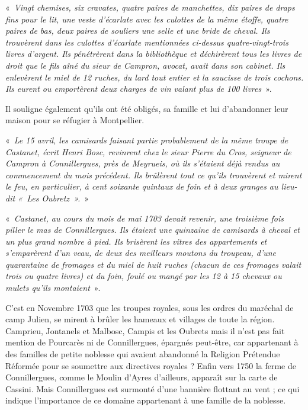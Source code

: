 «~\textit{Vingt chemises, six cravates, quatre paires de manchettes, dix paires de draps fins pour le lit,
une veste d’écarlate avec les culottes de la même étoffe, quatre paires de bas, deux paires de
souliers une selle et une bride de cheval. Ils trouvèrent dans les culottes d’écarlate
mentionnées ci-dessus quatre-vingt-trois livres d’argent. Ils pénétrèrent dans la bibliothèque
et déchirèrent tous les livres de droit que le fils aîné du sieur de Campron, avocat, avait dans
son cabinet. Ils enlevèrent le miel de 12 ruches, du lard tout entier et la saucisse de trois
cochons. Ils eurent ou emportèrent deux charges de vin valant plus de 100 livres}~».

Il souligne également qu’ils ont été obligés, sa famille et lui d’abandonner leur maison pour
se réfugier à Montpellier.

«~\textit{Le 15 avril, les camisards faisant partie probablement de la même troupe de Castanet, écrit
Henri Bosc, revinrent chez le sieur Pierre du Cros, seigneur de Campron à Connillergues,
près de Meyrueis, où ils s’étaient déjà rendus au commencement du mois précédent. Ils
brûlèrent tout ce qu’ils trouvèrent et mirent le feu, en particulier, à cent soixante quintaux de
foin et à deux granges au lieu-dit «~Les Oubretz~».}~»

«~\textit{Castanet, au cours du mois de mai 1703 devait revenir, une troisième fois piller le mas de
Connillergues. Ils étaient une quinzaine de camisards à cheval et un plus grand nombre à
pied. Ils brisèrent les vitres des appartements et s’emparèrent d’un veau, de deux des
meilleurs moutons du troupeau, d’une quarantaine de fromages et du miel de huit ruches
(chacun de ces fromages valait trois ou quatre livres) et du foin, foulé ou mangé par les 12 à
15 chevaux ou mulets qu’ils montaient}~».

C’est en Novembre 1703 que les troupes royales, sous les ordres du maréchal de camp Julien,
se mirent à brûler les hameaux et villages de toute la région. Camprieu, Jontanels et Malbosc,
Campis et les Oubrets mais il n’est pas fait mention de Pourcarès ni de Connillergues,
épargnés peut-être, car appartenant à des familles de petite noblesse qui avaient abandonné la
Religion Prétendue Réformée pour se soumettre aux directives royales ?
Enfin vers 1750 la ferme de Connillergues, comme le Moulin d’Ayres d’ailleurs, apparaît sur
la carte de Cassini. Mais Connillergues est surmonté d’une bannière flottant au vent ; ce qui
indique l’importance de ce domaine appartenant à une famille de la noblesse.

